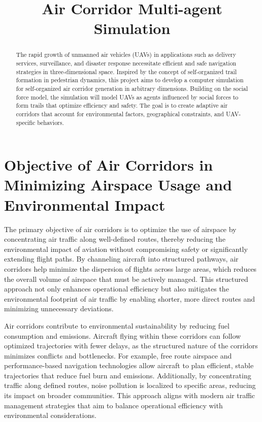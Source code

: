 \documentclass[letterpaper,11pt]{article}
\title{Air Corridor Multi-agent Simulation}
\begin{document}
\maketitle

\begin{abstract}
    The rapid growth of unmanned air vehicles (UAVs) in applications such as delivery services, surveillance, and disaster response necessitate efficient and safe navigation strategies in three-dimensional space. Inspired by the concept of self-organized trail formation in pedestrian dynamics, this project aims to develop a computer simulation for self-organized air corridor generation in arbitrary dimensions. Building on the social force model\cite{PhysRevE.51.4282}, the simulation will model UAVs as agents influenced by social forces to form trails that optimize efficiency and safety. The goal is to create adaptive air corridors that account for environmental factors, geographical constraints, and UAV-specific behaviors.
\end{abstract}


\section{Objective of Air Corridors in Minimizing Airspace Usage and Environmental Impact}

The primary objective of air corridors is to optimize the use of airspace by concentrating air traffic along well-defined routes, thereby reducing the environmental impact of aviation without compromising safety or significantly extending flight paths. By channeling aircraft into structured pathways, air corridors help minimize the dispersion of flights across large areas, which reduces the overall volume of airspace that must be actively managed. This structured approach not only enhances operational efficiency but also mitigates the environmental footprint of air traffic by enabling shorter, more direct routes and minimizing unnecessary deviations.

Air corridors contribute to environmental sustainability by reducing fuel consumption and emissions. Aircraft flying within these corridors can follow optimized trajectories with fewer delays, as the structured nature of the corridors minimizes conflicts and bottlenecks. For example, free route airspace and performance-based navigation technologies allow aircraft to plan efficient, stable trajectories that reduce fuel burn and emissions. Additionally, by concentrating traffic along defined routes, noise pollution is localized to specific areas, reducing its impact on broader communities. This approach aligns with modern air traffic management strategies that aim to balance operational efficiency with environmental considerations.
\end{document}
